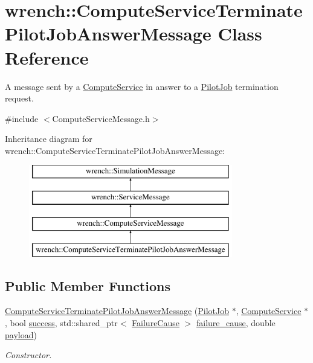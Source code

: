\hypertarget{classwrench_1_1_compute_service_terminate_pilot_job_answer_message}{}\section{wrench\+:\+:Compute\+Service\+Terminate\+Pilot\+Job\+Answer\+Message Class Reference}
\label{classwrench_1_1_compute_service_terminate_pilot_job_answer_message}


A message sent by a \hyperlink{classwrench_1_1_compute_service}{Compute\+Service} in answer to a \hyperlink{classwrench_1_1_pilot_job}{Pilot\+Job} termination request.  




{\ttfamily \#include $<$Compute\+Service\+Message.\+h$>$}

Inheritance diagram for wrench\+:\+:Compute\+Service\+Terminate\+Pilot\+Job\+Answer\+Message\+:\begin{figure}[H]
\begin{center}
\leavevmode
\includegraphics[height=4.000000cm]{classwrench_1_1_compute_service_terminate_pilot_job_answer_message}
\end{center}
\end{figure}
\subsection*{Public Member Functions}
\begin{DoxyCompactItemize}
\item 
\hyperlink{classwrench_1_1_compute_service_terminate_pilot_job_answer_message_a6aea586c71a440ed3eede569ea31cec6}{Compute\+Service\+Terminate\+Pilot\+Job\+Answer\+Message} (\hyperlink{classwrench_1_1_pilot_job}{Pilot\+Job} $\ast$, \hyperlink{classwrench_1_1_compute_service}{Compute\+Service} $\ast$, bool \hyperlink{classwrench_1_1_compute_service_terminate_pilot_job_answer_message_afa2b6acd7eb6b7ad23470402ef2badf0}{success}, std\+::shared\+\_\+ptr$<$ \hyperlink{classwrench_1_1_failure_cause}{Failure\+Cause} $>$ \hyperlink{classwrench_1_1_compute_service_terminate_pilot_job_answer_message_afeeb546d25637b2ff8eb39b70b51e121}{failure\+\_\+cause}, double \hyperlink{classwrench_1_1_simulation_message_a914f2732713f7c02898e66f05a7cb8a1}{payload})
\begin{DoxyCompactList}\small\item\em Constructor. \end{DoxyCompactList}\end{DoxyCompactItemize}
